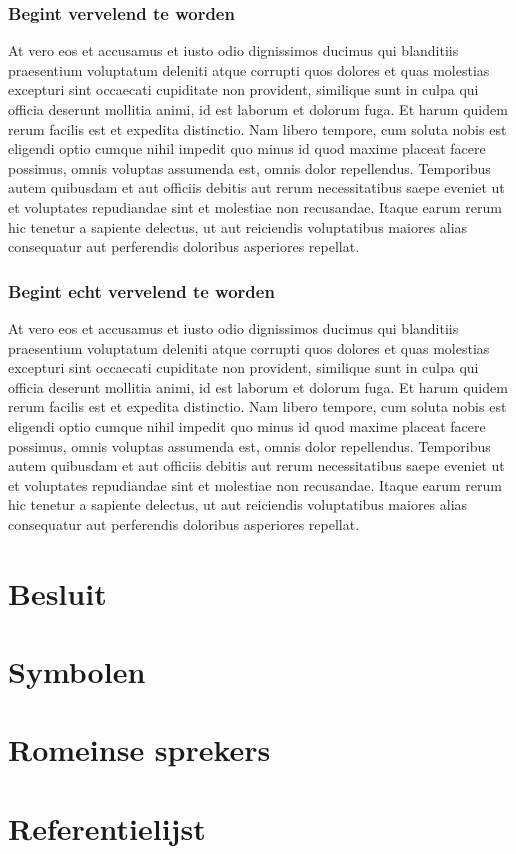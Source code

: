 \documentclass[a4paper,11pt,oneside,openright,english,qr]{uacoursetext}
\begin{document}
\subsection{Begint vervelend te worden}
At vero eos et accusamus et iusto odio dignissimos ducimus qui
blanditiis praesentium voluptatum deleniti atque corrupti quos dolores
et quas molestias excepturi sint occaecati cupiditate non provident,
similique sunt in culpa qui officia deserunt mollitia animi, id est
laborum et dolorum fuga. Et harum quidem rerum facilis est et expedita
distinctio. Nam libero tempore, cum soluta nobis est eligendi optio
cumque nihil impedit quo minus id quod maxime placeat facere possimus,
omnis voluptas assumenda est, omnis dolor repellendus. Temporibus
autem quibusdam et aut officiis debitis aut rerum necessitatibus saepe
eveniet ut et voluptates repudiandae sint et molestiae non
recusandae. Itaque earum rerum hic tenetur a sapiente delectus, ut aut
reiciendis voluptatibus maiores alias consequatur aut perferendis
doloribus asperiores repellat.

\newpage

\subsection{Begint echt vervelend te worden}
At vero eos et accusamus et iusto odio dignissimos ducimus qui
blanditiis praesentium voluptatum deleniti atque corrupti quos dolores
et quas molestias excepturi sint occaecati cupiditate non provident,
similique sunt in culpa qui officia deserunt mollitia animi, id est
laborum et dolorum fuga. Et harum quidem rerum facilis est et expedita
distinctio. Nam libero tempore, cum soluta nobis est eligendi optio
cumque nihil impedit quo minus id quod maxime placeat facere possimus,
omnis voluptas assumenda est, omnis dolor repellendus. Temporibus
autem quibusdam et aut officiis debitis aut rerum necessitatibus saepe
eveniet ut et voluptates repudiandae sint et molestiae non
recusandae. Itaque earum rerum hic tenetur a sapiente delectus, ut aut
reiciendis voluptatibus maiores alias consequatur aut perferendis
doloribus asperiores repellat.

\chapter{Besluit}

\backmatter
\appendix

\chapter{Symbolen}
\chapter{Romeinse sprekers}
\chapter{Referentielijst}

\makefinalpage
\end{document}
